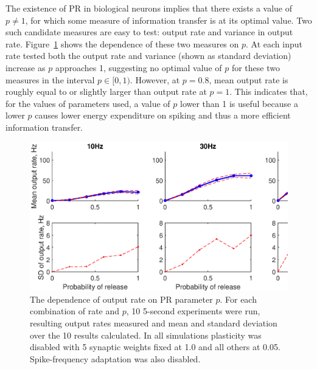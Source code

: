 \documentclass[a4paper,12pt]{report}
\theoremstyle{definition}
\begin{document}

The existence of PR in biological neurons implies that there exists a value of $p \neq 1$, for which some measure of information transfer is at its optimal value. Two such candidate measures are easy to test: output rate and variance in output rate. Figure~\ref{fig:exp7grid} shows the dependence of these two measures on $p$. At each input rate tested both the output rate and variance (shown as standard deviation) increase as $p$ approaches 1, suggesting no optimal value of $p$ for these two measures in the interval $p \in [0,1)$. However, at $p=0.8$, mean output rate is roughly equal to or slightly larger than output rate at $p=1$. This indicates that, for the values of parameters used, a value of $p$ lower than 1 is useful because a lower $p$ causes lower energy expenditure on spiking and thus a more efficient information transfer.

\begin{figure}[!htb]
    \includegraphics[width=\textwidth]{figures/exp7_PRoutputvariance_grid.eps}
    \caption{The dependence of output rate on PR parameter $p$. For each combination of rate and $p$, 10 5-second experiments were run, resulting output rates measured and mean and standard deviation over the 10 results calculated. In all simulations plasticity was disabled with 5 synaptic weights fixed at 1.0 and all others at 0.05. Spike-frequency adaptation was also disabled.}
    \label{fig:exp7grid}
\end{figure}
\end{document}
